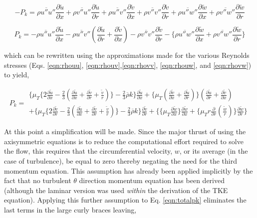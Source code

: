 \begin{displaymath}
	- P_k = \overline{\rho u'' u''}\frac{\partial \tilde u}{\partial x} + \overline{\rho v'' u''}  
	\frac{\partial \tilde u}{\partial r} + \overline{\rho u'' v''}\frac{\partial \tilde v}{\partial x}
	+ \overline{\rho v'' v''}\frac{\partial \tilde v}{\partial r} + \overline{\rho u'' w''}
	\frac{\partial \tilde w}{\partial x}+ \overline{\rho v'' w''}\frac{\partial \tilde w}{\partial r}
\end{displaymath} 

\begin{equation}
	P_k = -\overline{\rho u'' u''}\frac{\partial \tilde u}{\partial x} - \overline{\rho u'' v''}
	(\frac{\partial \tilde u}{\partial r} + \frac{\partial \tilde v}{\partial x})  
	- \overline{\rho v'' v''}\frac{\partial \tilde v}{\partial r} - \Big\{\overline{\rho u'' w''}
	\frac{\partial \tilde w}{\partial x}+ \overline{\rho v'' w''}\frac{\partial \tilde w}{\partial r}\Big\}
\label{eqn:pk}
\end{equation} 

	which can be rewritten using the approximations made for the various Reynolds stresses (Eqs. \ref{eqn:rhouu},
\ref{eqn:rhouv},\ref{eqn:rhovv}, \ref{eqn:rhouw}, and \ref{eqn:rhovw}) to yield,

\begin{equation}
	P_k = 
	\begin{array}{c}
	\Bigg\{ \mu_T\Big\{2\frac{\partial \tilde{u}}{\partial x} - \frac{2}{3}
	(\frac{\partial \tilde{u}}{\partial x} + \frac{\partial \tilde{v}}{\partial r} + \frac{\tilde{v}}{r})\Big\}
	-\frac{2}{3}\overline{\rho}k\Bigg\} \frac{\partial \tilde u}{\partial x}  
	+ \Big\{ \mu_T(\frac{\partial \tilde{v}}{\partial x} + \frac{\partial \tilde{u}}{\partial r})\Big\}
	(\frac{\partial \tilde u}{\partial r} + \frac{\partial \tilde v}{\partial x})
	\\ + \Bigg\{ \mu_T\Big\{2\frac{\partial \tilde{v}}{\partial r} - \frac{2}{3}
	(\frac{\partial \tilde{u}}{\partial x} + \frac{\partial \tilde{v}}{\partial r} + \frac{\tilde{v}}{r})\Big\}
	-\frac{2}{3}\overline{\rho}k \Bigg\} \frac{\partial \tilde v}{\partial r}
	+ \Bigg\{ \Big\{\mu_T \frac{\partial \tilde w}{\partial x}\Big\}\frac{\partial \tilde w}{\partial x}
	+ \Big\{ \mu_T r\frac{\partial}{\partial r}(\frac{\tilde w}{r})\Big\}\frac{\partial \tilde w}{\partial r} \Bigg\}
	\end{array}
\label{eqn:totalpk}
\end{equation}
	
	At this point a simplification will be made.  Since the major thrust of using the axisymmetric equations
is to reduce the computational effort required to solve the flow, this requires that the circumferential velocity, $w$, or
its average (in the case of turbulence), be equal to zero thereby negating the need for the third momentum equation. 
This assumption has already been applied implicitly by the fact that no turbulent $\theta$ direction momentum equation
has been derived (although the laminar version was used \emph{within} the derivation of the TKE equation).  Applying this
further assumption to Eq. \ref{eqn:totalpk} eliminates the last terms in the large curly braces leaving,

